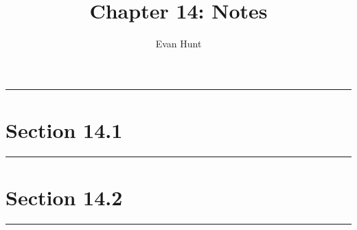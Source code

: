 \documentclass[12pt]{article}
\title{Chapter 14: Notes}
\author{Evan Hunt}
\begin{document}
    \maketitle

    \noindent\rule{\textwidth}{0.4pt}
    \section*{Section 14.1}
    \noindent\rule{\textwidth}{0.4pt}


    \section*{Section 14.2}
    \noindent\rule{\textwidth}{0.4pt}
    
\end{document}
